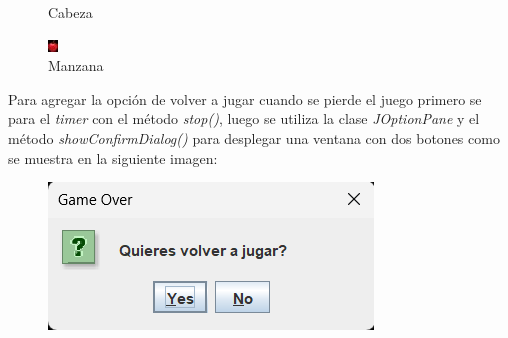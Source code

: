 \documentclass[11pt, twocolumn]{article}
\begin{document}
\begin{figure}[ht]
\begin{minipage}[c]{0.3\columnwidth}
      \caption*{Cabeza}
    \end{minipage}
    \begin{minipage}[r]{0.25\columnwidth}
      \includegraphics[width=\columnwidth, right]{apple.jpg}
      \caption*{Manzana}
    \end{minipage}
  \end{figure}

  Para agregar la opción de volver a jugar cuando se pierde el juego primero se para el \textit{timer} con el método \textit{stop()}, luego se utiliza la clase \textit{JOptionPane} y el método \textit{showConfirmDialog()} para desplegar una ventana con dos botones como se muestra en la siguiente imagen:

  \begin{figure}[ht]
    \includegraphics[width=0.75\columnwidth, center]{v1.png}
  \end{figure}
\end{document}
